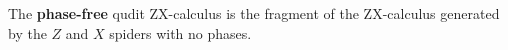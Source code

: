 \begin{definition}
The {\bf phase-free} qudit ZX-calculus
is the fragment of the ZX-calculus generated by the $Z$ and $X$ spiders with no phases.
%
\end{definition}


